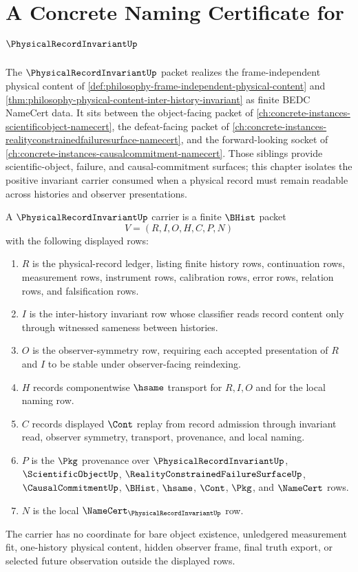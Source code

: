 \chapter{A Concrete Naming Certificate for $\PhysicalRecordInvariantUp$}
\label{ch:concrete-instances-physicalrecordinvariant-namecert}

The $\PhysicalRecordInvariantUp$ packet realizes the frame-independent physical content of \autoref{def:philosophy-frame-independent-physical-content} and \autoref{thm:philosophy-physical-content-inter-history-invariant} as finite BEDC NameCert data. It sits between the object-facing packet of \autoref{ch:concrete-instances-scientificobject-namecert}, the defeat-facing packet of \autoref{ch:concrete-instances-realityconstrainedfailuresurface-namecert}, and the forward-looking socket of \autoref{ch:concrete-instances-causalcommitment-namecert}. Those siblings provide scientific-object, failure, and causal-commitment surfaces; this chapter isolates the positive invariant carrier consumed when a physical record must remain readable across histories and observer presentations.

\begin{definition}
\label{def:physical-record-invariant-carrier}
A $\PhysicalRecordInvariantUp$ carrier is a finite $\BHist$ packet
$$
V=(R,I,O,H,C,P,N)
$$
with the following displayed rows:
\begin{enumerate}
\item $R$ is the physical-record ledger, listing finite history rows, continuation rows, measurement rows, instrument rows, calibration rows, error rows, relation rows, and falsification rows.
\item $I$ is the inter-history invariant row whose classifier reads record content only through witnessed sameness between histories.
\item $O$ is the observer-symmetry row, requiring each accepted presentation of $R$ and $I$ to be stable under observer-facing reindexing.
\item $H$ records componentwise $\hsame$ transport for $R,I,O$ and for the local naming row.
\item $C$ records displayed $\Cont$ replay from record admission through invariant read, observer symmetry, transport, provenance, and local naming.
\item $P$ is the $\Pkg$ provenance over $\PhysicalRecordInvariantUp$, $\ScientificObjectUp$, $\RealityConstrainedFailureSurfaceUp$, $\CausalCommitmentUp$, $\BHist$, $\hsame$, $\Cont$, $\Pkg$, and $\NameCert$ rows.
\item $N$ is the local $\NameCert_{\PhysicalRecordInvariantUp}$ row.
\end{enumerate}
The carrier has no coordinate for bare object existence, unledgered measurement fit, one-history physical content, hidden observer frame, final truth export, or selected future observation outside the displayed rows.
\end{definition}

